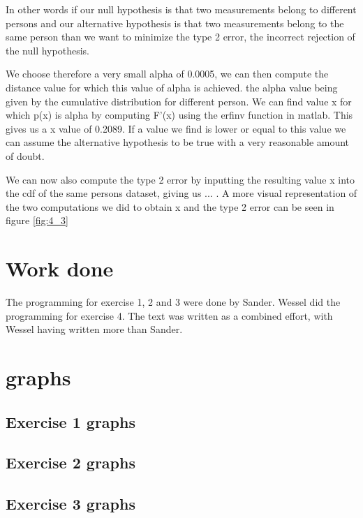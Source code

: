 \documentclass[10pt,a4paper]{article}
\begin{document}
In other words if our null hypothesis is that two measurements belong to different persons and our alternative hypothesis is that two measurements belong to the same person than we want to minimize the type 2 error, the incorrect rejection of the null hypothesis. 

We choose therefore a very small alpha of 0.0005, we can then compute the distance value for which this value of alpha is achieved. the alpha value being given by the cumulative distribution for different person. We can find value x for which p(x) is alpha by computing F'(x) using the erfinv function in matlab. This gives us a x value of 0.2089. If a value we find is lower or equal to this value we can assume the alternative hypothesis to be true with a very reasonable amount of doubt.

We can now also compute the type 2 error by inputting the resulting value x into the cdf of the same persons dataset, giving us ... . A more visual representation of the two computations we did to obtain x and the type 2 error can be seen in figure \ref{fig:4_3}

\section{Work done}
The programming for exercise 1, 2 and 3 were done by Sander. Wessel did the programming for exercise 4. The text was written as a combined effort, with Wessel having written more than Sander.

\appendix
\section{graphs}
\subsection{Exercise 1 graphs}

\subsection{Exercise 2 graphs}

\subsection{Exercise 3 graphs}
\end{document}
